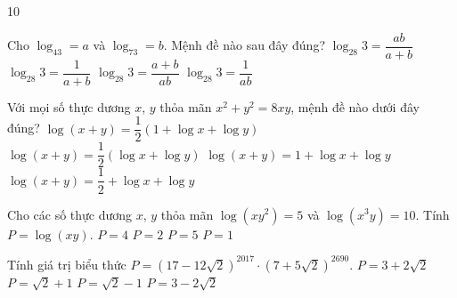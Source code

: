 \begin{indapan}{10}
\begin{ex}%
	Cho $\log_43=a$ và $\log_73=b$. Mệnh đề nào sau đây đúng?
	\choice
	{\True $\log_{28}3=\dfrac{ab}{a+b}$}
	{$\log_{28}3=\dfrac{1}{a+b}$}
	{$\log_{28}3=\dfrac{a+b}{ab}$}
	{$\log_{28}3=\dfrac{1}{ab}$}
\end{ex}

\begin{ex}%
	Với mọi số thực dương $x$, $y$ thỏa mãn $x^2+y^2=8xy$, mệnh đề nào dưới đây đúng? 
	\choice
	{\True $\log(x+y)=\dfrac{1}{2}(1+\log x+\log y)$}
	{$\log(x+y)=\dfrac{1}{2}(\log x+\log y)$}
	{$\log(x+y)=1+\log x+\log y$}
	{$\log(x+y)=\dfrac{1}{2}+\log x+\log y$}
\end{ex}

\begin{ex}%
	Cho các số thực dương $x$, $y$ thỏa mãn $\log(xy^2)=5$ và $\log(x^3y)=10$. Tính $P=\log(xy)$.
	\choice
	{\True $P=4$}
	{$P=2$}
	{$P=5$}
	{$P=1$}
\end{ex}

\begin{ex}%
	Tính giá trị biểu thức $P=\left(17-12\sqrt{2}\right)^{2017}\cdot\left(7+5\sqrt{2}\right)^{2690}$.
	\choice
	{\True $P=3+2\sqrt{2}$}
	{$P=\sqrt{2}+1$}
	{$P=\sqrt{2}-1$}
	{$P=3-2\sqrt{2}$}
\end{ex}


\end{indapan}
